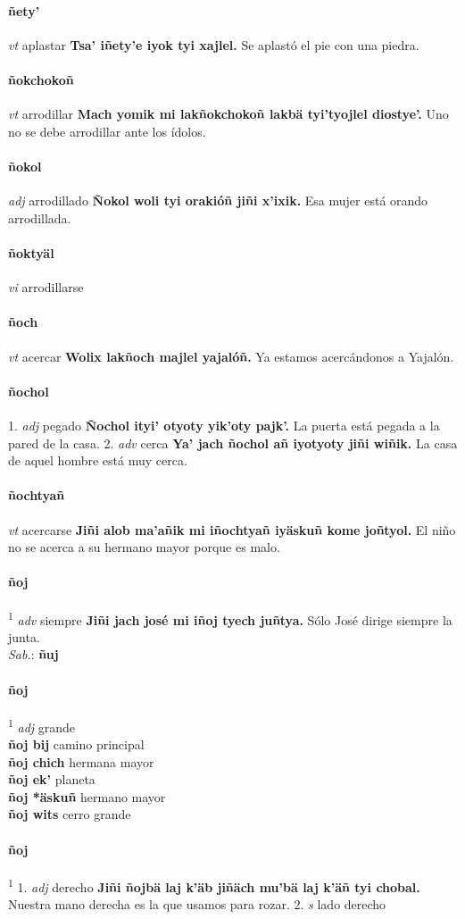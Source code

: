 \documentclass{scrbook}
\newcommand{\entry}[1]{\paragraph{#1}}
\newcommand{\onedefinition}[1]{#1.}
\newcommand{\defsuperscript}[1]{\textsuperscript{1}}
\newcommand{\partofspeech}[1]{\textit{#1}}
\newcommand{\spanishtranslation}[1]{#1}
\newcommand{\cholexample}[1]{\textbf{#1}}
\newcommand{\exampletranslation}[1]{#1}
\newcommand{\dialectvariant}[1]{\\\textit{#1}:}
\newcommand{\dialectword}[1]{\textbf{#1}}
\newcommand{\secondaryentry}[1]{\\\textbf{#1}}
\newcommand{\secondtranslation}[1]{#1}
\begin{document}
\begin{multicols}{2}
\entry{ñety'}
\partofspeech{vt}
\spanishtranslation{aplastar}
\cholexample{Tsa' iñety'e iyok tyi xajlel.}
\exampletranslation{Se aplastó el pie con una piedra.}

\entry{ñokchokoñ}
\partofspeech{vt}
\spanishtranslation{arrodillar}
\cholexample{Mach yomik mi lakñokchokoñ lakbä tyi'tyojlel diostye'.}
\exampletranslation{Uno no se debe arrodillar ante los ídolos.}

\entry{ñokol}
\partofspeech{adj}
\spanishtranslation{arrodillado}
\cholexample{Ñokol woli tyi orakióñ jiñi x'ixik.}
\exampletranslation{Esa mujer está orando arrodillada.}

\entry{ñoktyäl}
\partofspeech{vi}
\spanishtranslation{arrodillarse}

\entry{ñoch}
\partofspeech{vt}
\spanishtranslation{acercar}
\cholexample{Wolix lakñoch majlel yajalóñ.}
\exampletranslation{Ya estamos acercándonos a Yajalón.}

\entry{ñochol}
\onedefinition{1}
\partofspeech{adj}
\spanishtranslation{pegado}
\cholexample{Ñochol ityi' otyoty yik'oty pajk'.}
\exampletranslation{La puerta está pegada a la pared de la casa.}
\onedefinition{2}
\partofspeech{adv}
\spanishtranslation{cerca}
\cholexample{Ya' jach ñochol añ iyotyoty jiñi wiñik.}
\exampletranslation{La casa de aquel hombre está muy cerca.}

\entry{ñochtyañ}
\partofspeech{vt}
\spanishtranslation{acercarse}
\cholexample{Jiñi alob ma'añik mi iñochtyañ iyäskuñ kome joñtyol.}
\exampletranslation{El niño no se acerca a su hermano mayor porque es malo.}

\entry{ñoj}
\defsuperscript{3}
\partofspeech{adv}
\spanishtranslation{siempre}
\cholexample{Jiñi jach josé mi iñoj tyech juñtya.}
\exampletranslation{Sólo José dirige siempre la junta.}
\dialectvariant{Sab.}
\dialectword{ñuj}

\entry{ñoj}
\defsuperscript{1}
\partofspeech{adj}
\spanishtranslation{grande}
\secondaryentry{ñoj bij}
\secondtranslation{camino principal}
\secondaryentry{ñoj chich}
\secondtranslation{hermana mayor}
\secondaryentry{ñoj ek'}
\secondtranslation{planeta}
\secondaryentry{ñoj *äskuñ}
\secondtranslation{hermano mayor}
\secondaryentry{ñoj wits}
\secondtranslation{cerro grande}

\entry{ñoj}
\defsuperscript{2}
\onedefinition{1}
\partofspeech{adj}
\spanishtranslation{derecho}
\cholexample{Jiñi ñojbä laj k'äb jiñäch mu'bä laj k'äñ tyi chobal.}
\exampletranslation{Nuestra mano derecha es la que usamos para rozar.}
\onedefinition{2}
\partofspeech{s}
\spanishtranslation{lado derecho}


\end{multicols}
\end{document}
